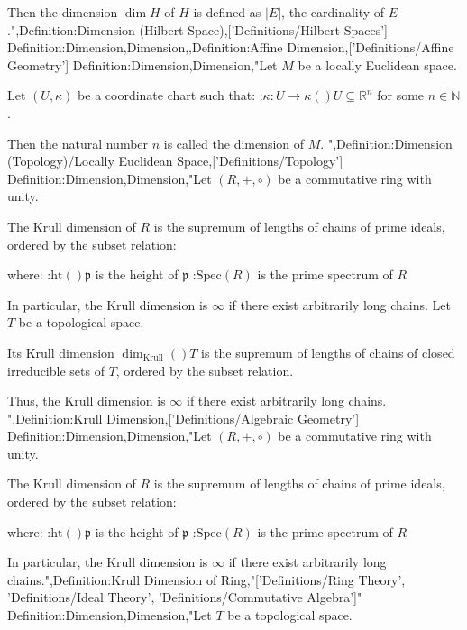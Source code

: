Then the dimension $\dim H$ of $H$ is defined as $\left\lvert E \right\rvert$, the cardinality of $E$.",Definition:Dimension (Hilbert Space),['Definitions/Hilbert Spaces']
Definition:Dimension,Dimension,,Definition:Affine Dimension,['Definitions/Affine Geometry']
Definition:Dimension,Dimension,"Let $M$ be a locally Euclidean space. 

Let $\left( U, \kappa \right)$ be a coordinate chart such that: 
:$\kappa: U \to \kappa \left(   \right)U \subseteq \mathbb R^n$
for some $n \in \mathbb N$.


Then the natural number $n$ is called the dimension of $M$.
",Definition:Dimension (Topology)/Locally Euclidean Space,['Definitions/Topology']
Definition:Dimension,Dimension,"Let $\left( R, +, \circ \right)$ be a commutative ring with unity.


The Krull dimension of $R$ is the supremum of lengths of chains of prime ideals, ordered by the subset relation:




where:
:$\mathrm {ht}  \left(   \right){\mathfrak p}$ is the height of $\mathfrak p$
:$\mathrm {Spec} \left( R \right)$ is the prime spectrum of $R$



In particular, the Krull dimension is $\infty$ if there exist arbitrarily long chains.
Let $T$ be a topological space.


Its Krull dimension $\dim_{\mathrm {Krull} }  \left(   \right)T$ is the supremum of lengths of chains of closed irreducible sets of $T$, ordered by the subset relation.

Thus, the Krull dimension is $\infty$ if there exist arbitrarily long chains.
",Definition:Krull Dimension,['Definitions/Algebraic Geometry']
Definition:Dimension,Dimension,"Let $\left( R, +, \circ \right)$ be a commutative ring with unity.


The Krull dimension of $R$ is the supremum of lengths of chains of prime ideals, ordered by the subset relation:




where:
:$\mathrm {ht}  \left(   \right){\mathfrak p}$ is the height of $\mathfrak p$
:$\mathrm {Spec} \left( R \right)$ is the prime spectrum of $R$



In particular, the Krull dimension is $\infty$ if there exist arbitrarily long chains.",Definition:Krull Dimension of Ring,"['Definitions/Ring Theory', 'Definitions/Ideal Theory', 'Definitions/Commutative Algebra']"
Definition:Dimension,Dimension,"Let $T$ be a topological space.


